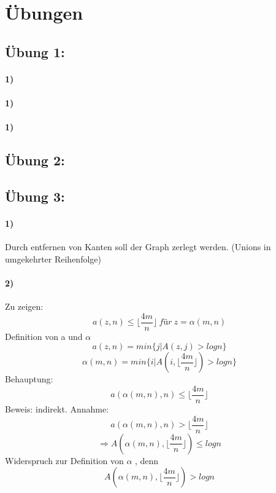 

\section{Übungen}
\subsection*{Übung 1:}
\paragraph{1)}  
\paragraph{1)}
\paragraph{1)}


\subsection*{Übung 2:}



\subsection*{Übung 3:}
\paragraph{1)} Durch entfernen von Kanten soll der Graph zerlegt werden. (Unions in umgekehrter Reihenfolge)

\paragraph{2)}
Zu zeigen:
$$ a(z,n) \leq \lfloor\frac{4m}{n}\rfloor\ für\  z=\alpha (m,n) $$
Definition von a und $ \alpha $ 
$$a(z,n) = min \{j|A(z,j) > logn \} $$
$$\alpha(m,n)=min\{i|A(i, \lfloor\frac{4m}{n}\rfloor) > logn\}$$
Behauptung:
$$a(\alpha(m,n), n) \leq \lfloor\frac{4m}{n}\rfloor$$
Beweis: indirekt. Annahme:
$$a(\alpha(m,n), n) > \lfloor\frac{4m}{n}\rfloor$$
$$\Rightarrow A(\alpha(m,n),\lfloor\frac{4m}{n}\rfloor) \leq logn $$
Widerspruch zur Definition von $ \alpha $ , denn
$$A(\alpha(m,n),\lfloor\frac{4m}{n}\rfloor) > logn $$


